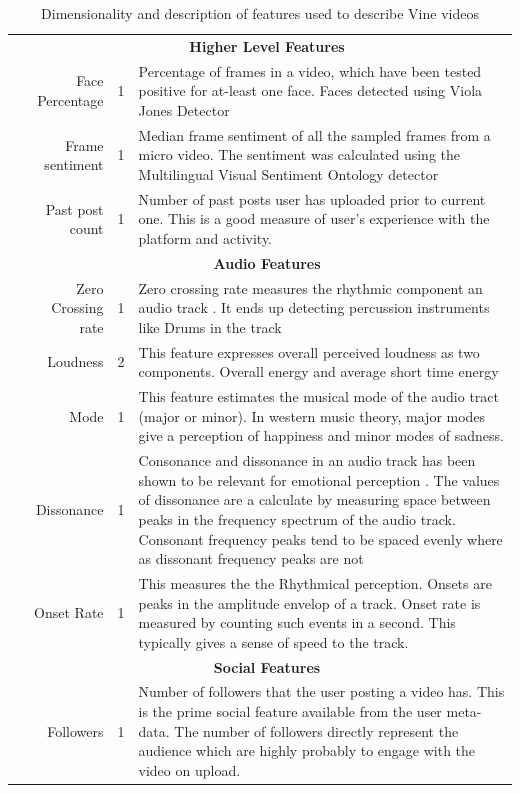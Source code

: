 \begin{table}[hp]
{\begin{tabular}{|c|r|c|p{17cm}|}
            \cline{2-4}	
            &	\multicolumn{3}{c|}{\textbf{Higher Level Features}} \\
            \cline{2-4}
            & Face Percentage & 1 & Percentage of frames in a video, which have been tested positive for at-least one face. Faces detected using Viola Jones Detector \cite{viola2004robust}\\
            & Frame sentiment & 1 & Median frame sentiment of all the sampled frames from a micro video. The sentiment was calculated using the Multilingual Visual Sentiment 
            Ontology detector \cite{jou2015visual} \\
            & Past post count & 1 & Number of past posts user has uploaded prior to current one. This is a good measure of user's experience with the platform and activity.\\
            
            \cline{2-4}
            & \multicolumn{3}{c|}{\textbf{Audio Features}} \\
            \cline{2-4}
            & Zero Crossing rate & 1 & Zero crossing rate measures the rhythmic component an audio track \cite{laurier2009exploring}. It ends up detecting percussion instruments like Drums in the track\\
            & Loudness & 2 & This feature expresses overall perceived loudness as two components. Overall energy and average short time energy \cite{lartillot2007matlab}\\
            & Mode & 1 & This feature estimates the musical mode of the audio tract (major or minor). In western music theory, major modes give a perception of happiness and minor modes of sadness. \cite{laurier2009exploring} \\
            & Dissonance & 1 & Consonance and dissonance in an audio track has been shown to be relevant for emotional perception \cite{laurier2009exploring}. The values of dissonance are a calculate by measuring space between peaks in the frequency spectrum of the audio track. Consonant frequency peaks tend to be spaced evenly where as dissonant frequency peaks are not\\
            & Onset Rate & 1 & This measures the the Rhythmical perception. Onsets are peaks in the amplitude envelop of a track. Onset rate is measured by counting such events in a second. This typically gives a sense of speed to the track. \\
            \cline{2-4}
            &	\multicolumn{3}{c|}{\textbf{Social Features}} \\
            \cline{2-4}
            & Followers & 1 & Number of followers that the user posting a video has. This is the prime social feature available from the user meta-data. The number of followers directly represent the audience which are highly probably to engage with the video on upload.\\
            \hline
        \end{tabular}
    }
    \caption{Dimensionality and description of features used to describe Vine videos}
    \label{tab:Features_table}
\end{table}


